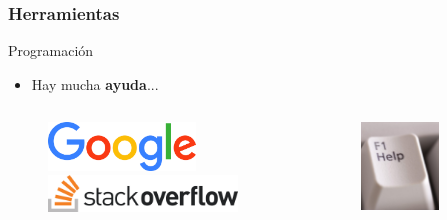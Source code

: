 \documentclass{beamer}
\begin{document}
\begin{frame}\frametitle{Herramientas}
	\begin{block}{Programación}
		\begin{itemize} \item Hay mucha \textbf{ayuda}... \end{itemize}
		\begin{columns}
			\begin{column}{0.5\textwidth}
				\begin{figure}
					\centering
					\includegraphics[width=0.7\textwidth]{logos/google}\\[4ex]
					\includegraphics[width=0.9\textwidth]{logos/stackoverflow}
				\end{figure}
			\end{column}
			\begin{column}{0.5\textwidth}
				\begin{figure}
					\centering
					\includegraphics[width=0.7\textwidth]{images/f1}
				\end{figure}
			\end{column}
		\end{columns}
	\end{block}
\end{frame}
\end{document}
